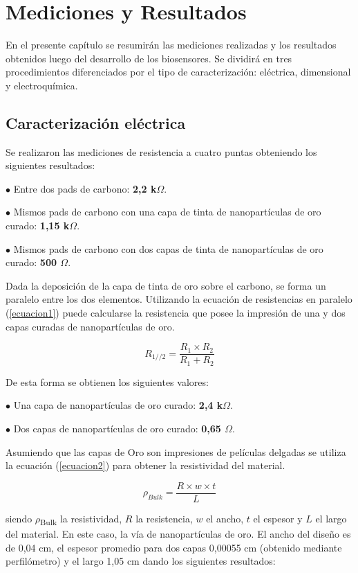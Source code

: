 \chapter{Mediciones y Resultados}
En el presente capítulo se resumirán las mediciones realizadas y los resultados obtenidos luego del desarrollo de los biosensores. Se dividirá en tres procedimientos diferenciados por el tipo de caracterización: eléctrica, dimensional y electroquímica.

\section{Caracterización eléctrica}
Se realizaron las mediciones de resistencia a cuatro puntas obteniendo los siguientes resultados:

$\bullet$ Entre dos pads de carbono: \textbf{2,2 k$\Omega$}.

$\bullet$ Mismos pads de carbono con una capa de tinta de nanopartículas de oro curado: \textbf{1,15 k$\Omega$}.

$\bullet$ Mismos pads de carbono con dos capas de tinta de nanopartículas de oro curado: \textbf{500 $\Omega$}.

Dada la deposición de la capa de tinta de oro sobre el carbono, se forma un paralelo entre los dos elementos. Utilizando la ecuación de resistencias en paralelo (\ref{ecuacion1}) puede calcularse la resistencia que posee la impresión de una y dos capas curadas de nanopartículas de oro.

\begin{equation}\label{ecuacion1}
R_{1//2}=\frac{R_{1} \times R_{2}}{R_{1}+R_{2}}
\end{equation}

De esta forma se obtienen los siguientes valores:

$\bullet$ Una capa de nanopartículas de oro curado: \textbf{2,4 k$\Omega$}.

$\bullet$ Dos capas de nanopartículas de oro curado: \textbf{0,65 $\Omega$}.


Asumiendo que las capas de Oro son impresiones de películas delgadas se utiliza la ecuación (\ref{ecuacion2}) para obtener la resistividad del material.

\begin{equation}\label{ecuacion2}
\rho_{Bulk}=\frac{R \times w \times t}{L}
\end{equation}

siendo $\rho$\textsubscript{Bulk} la resistividad, $R$ la resistencia, $w$ el ancho, $t$ el espesor y $L$ el largo del material. En este caso, la vía de nanopartículas de oro. El ancho del diseño es de 0,04 cm, el espesor promedio para dos capas 0,00055 cm (obtenido mediante perfilómetro) y el largo 1,05 cm dando los siguientes resultados:

